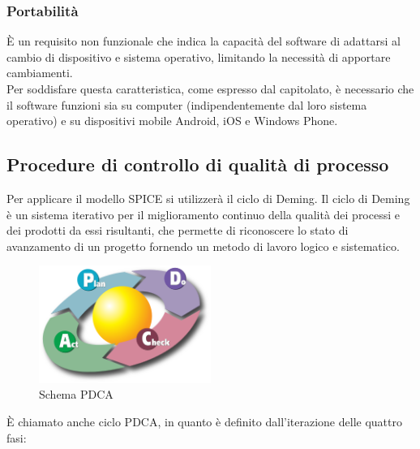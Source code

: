 \subsubsection{Portabilità}
È un requisito non funzionale che indica la capacità del software di adattarsi al cambio di dispositivo e sistema operativo, limitando la necessità di apportare cambiamenti.\\
Per soddisfare questa caratteristica, come espresso dal capitolato, è necessario che il software funzioni sia su computer (indipendentemente dal loro sistema operativo) e su dispositivi mobile Android, iOS e Windows Phone.

\subsection{Procedure di controllo di qualità di processo}
Per applicare il modello SPICE si utilizzerà il ciclo di Deming. Il ciclo di Deming è un sistema iterativo per il miglioramento continuo della qualità dei processi e dei prodotti da essi risultanti, che permette di riconoscere lo stato di avanzamento di un progetto fornendo un metodo di lavoro logico e sistematico.

\begin{figure}[h]
  \centering
    \includegraphics[width=0.5\textwidth]{./images/deming}
  \caption{Schema PDCA}
  \label{fig:deming}
\end{figure}

È chiamato anche ciclo PDCA, in quanto è definito dall'iterazione delle quattro fasi:
 
